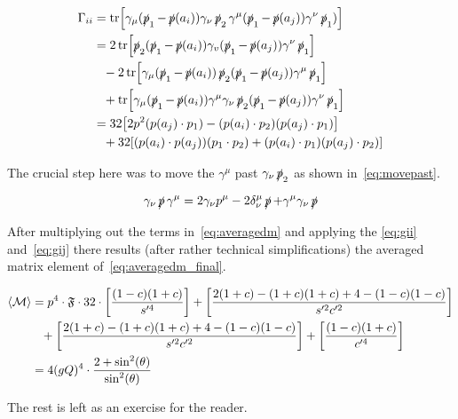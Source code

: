 \begin{equation}
  \label{eq:gij}
  \begin{split}
\Gamma_{ii} &=
\tr[\gamma_\mu(\operatorname{\slashed{p}}_1-\operatorname{\slashed{p}}(a_i))\gamma_\nu\operatorname{\slashed{p}}_2\gamma^\mu(\operatorname{\slashed{p}}_1-\operatorname{\slashed{p}}(a_j))\gamma^\nu\operatorname{\slashed{p}}_1)]\\
&= 2\tr[\operatorname{\slashed{p}}_2(\operatorname{\slashed{p}}_1-\operatorname{\slashed{p}}(a_i))\gamma_v(\operatorname{\slashed{p}}_1-\operatorname{\slashed{p}}(a_j))\gamma^\nu\operatorname{\slashed{p}}_1]\\
&\hphantom{=} - 2\tr[\gamma_\mu(\operatorname{\slashed{p}}_1-\operatorname{\slashed{p}}(a_i))\operatorname{\slashed{p}}_2(\operatorname{\slashed{p}}_1-\operatorname{\slashed{p}}(a_j))\gamma^\mu\operatorname{\slashed{p}}_1]\\
&\hphantom{=} +
\tr[\gamma_\mu(\operatorname{\slashed{p}}_1-\operatorname{\slashed{p}}(a_i))\gamma^\mu\gamma_\nu\operatorname{\slashed{p}}_2(\operatorname{\slashed{p}}_1-\operatorname{\slashed{p}}(a_j))\gamma^\nu\operatorname{\slashed{p}}_1]\\
&= 32 \qty[2p^2(p(a_j)\cdot p_1) - (p(a_i)\cdot p_2)(p(a_j)\cdot p_1)]
   \\
&\hphantom{=} + 32\qty[(p(a_i)\cdot p(a_j))(p_1\cdot p_2) + (p(a_i)\cdot p_1)(p(a_j)\cdot p_2)]
\end{split}
\end{equation}

The crucial step here was to move the \(\gamma^\mu\) past
\(\gamma_\nu\operatorname{\slashed{p}}_2\) as shown in~\eqref{eq:movepast}.

\begin{equation}
  \label{eq:movepast}
  \gamma_\nu\operatorname{\slashed{p}}\gamma^\mu = 2\gamma_\nu p^\mu - 2\delta_\nu^\mu\operatorname{\slashed{p}} +
  \gamma^\mu\gamma_\nu\operatorname{\slashed{p}}
\end{equation}

After multiplying out the terms in~\eqref{eq:averagedm} and applying
the \eqref{eq:gii} and~\eqref{eq:gij} there results (after
rather technical simplifications) the
averaged matrix element of~\eqref{eq:averagedm_final}.

\begin{equation}
  \label{eq:averagedm_final}
  \begin{split}
  \langle\mathcal{M}\rangle &= p^4\cdot\mathfrak{F}\cdot
  32\cdot\qty[\frac{(1-c)(1+c)}{s'^4}] + \qty[\frac{2(1+c) -
    (1+c)(1+c)+4-(1-c)(1-c)}{s'^2c'^2}] \\
  &\hphantom{=} +\qty[\frac{2(1+c) -
    (1+c)(1+c)+4-(1-c)(1-c)}{s'^2c'^2}] +
  \qty[\frac{(1-c)(1+c)}{c'^4}] \\
  &= 4(gQ)^4 \cdot\frac{2+\sin^2(\theta)}{\sin^2(\theta)}
  \end{split}
\end{equation}

The rest is left as an exercise for the reader.
